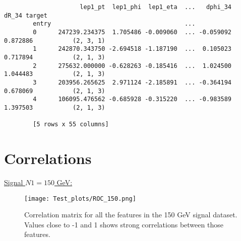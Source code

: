 \documentclass[a4paper, american, 12pt]{report}
\begin{document}
\begin{lstlisting}
					 lep1_pt  lep1_phi  lep1_eta  ...   dphi_34     dR_34 target
		entry                                     ...
		0      247239.234375  1.705486 -0.009060  ... -0.059092  0.872886  			(2, 3, 1)
		1      242870.343750 -2.694518 -1.187190  ...  0.105023  0.717894  			(2, 1, 3)
		2      275632.000000 -0.628263 -0.185416  ...  1.024500  1.044483  			(2, 1, 3)
		3      203956.265625  2.971124 -2.185891  ... -0.364194  0.678069  			(2, 1, 3)
		4      106095.476562 -0.685928 -0.315220  ... -0.983589  1.397503  			(2, 1, 3)
		
		[5 rows x 55 columns]
	\end{lstlisting}

	
	\chapter{Correlations}
	\label{appendix:Correlations}
	\underline{Signal $N1=150$ GeV:}
	\begin{figure}[h!tb]
		\centering\texttt{[image: Test\_plots/ROC\_150.png]}
		\caption[Correlation matrix for the features in the 150 GeV signal.]{Correlation matrix for all the features in the 150 GeV signal dataset. Values close to -1 and 1 shows strong correlations between those features. \label{fig:Corr_150}}
	\end{figure}
\end{document}

